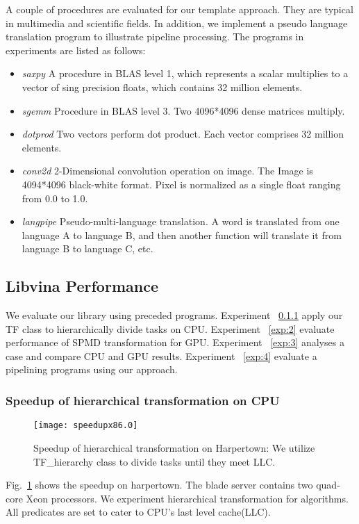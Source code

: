 A couple of procedures are evaluated for our template approach.  They
are typical in multimedia and scientific fields. In
addition, we implement a pseudo language translation program to
illustrate pipeline processing. The programs in experiments are listed
as follows:

\begin{itemize}
\item \textit{saxpy} A procedure in BLAS level 1, which represents a
  scalar multiplies to a vector of sing precision floats, which contains 32 million elements.
\item \textit{sgemm} Procedure in BLAS level 3. Two 4096*4096 dense matrices multiply.
\item \textit{dotprod} Two vectors perform dot product. Each vector
  comprises 32 million elements.
\item \textit{conv2d} 2-Dimensional convolution operation on image.  The Image
  is 4094*4096 black-white format. Pixel is normalized as a single
  float ranging from 0.0 to 1.0.
\item \textit{langpipe} Pseudo-multi-language translation. A word is translated from one language A to language B, and then another function will translate it from language B to language C, etc.
\end{itemize}


\subsection{Libvina Performance}
We evaluate our library using preceded programs. Experiment
~\ref{exp:1} apply our TF class to hierarchically divide
tasks on CPU. Experiment ~\ref{exp:2} evaluate performance of SPMD
transformation for GPU. Experiment ~\ref{exp:3} analyses a case and
compare CPU and GPU results. Experiment
~\ref{exp:4} evaluate a pipelining programs using our approach.
\subsubsection{Speedup of hierarchical transformation on CPU}\label{exp:1}
\begin{figure}
\texttt{[image: speedupx86.0]}
\caption{Speedup of hierarchical transformation on Harpertown: We
  utilize TF\_hierarchy class to divide tasks until they meet LLC.}\label{fig:spdx86}
\end{figure}

Fig.~\ref{fig:spdx86} shows the speedup on harpertown. The blade
server contains two quad-core Xeon
processors. We experiment hierarchical transformation for
algorithms. All predicates are set to cater to CPU's last level cache(LLC).

